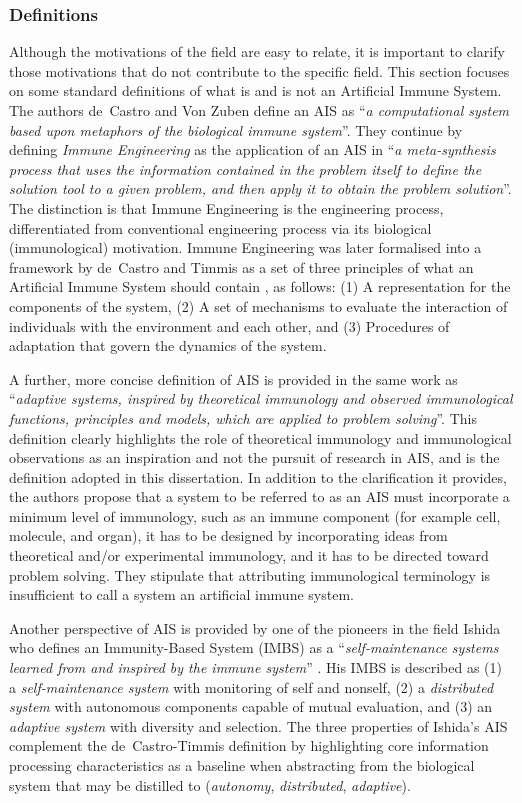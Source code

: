 %
%
\subsubsection{Definitions}
Although the motivations of the field are easy to relate, it is important to clarify those motivations that do not contribute to the specific field. This section focuses on some standard definitions of what is and is not an Artificial Immune System. The authors de~Castro and Von Zuben \cite{Castro2000a} define an AIS as ``\emph{a computational system based upon metaphors of the biological immune system}''. They continue by defining \emph{Immune Engineering} as the application of an AIS in ``\emph{a meta-synthesis process that uses the information contained in the problem itself to define the solution tool to a given problem, and then apply it to obtain the problem solution}''. The distinction is that Immune Engineering is the engineering process, differentiated from conventional engineering process via its biological (immunological) motivation. Immune Engineering was later formalised into a framework by de~Castro and Timmis as a set of three principles of what an Artificial Immune System should contain \cite{Castro2002a}, as follows: (1) A representation for the components of the system, (2) A set of mechanisms to evaluate the interaction of individuals with the environment and each other, and (3) Procedures of adaptation that govern the dynamics of the system.

A further, more concise definition of AIS is provided in the same work as ``\emph{adaptive systems, inspired by theoretical immunology and observed immunological functions, principles and models, which are applied to problem solving}''. This definition clearly highlights the role of theoretical immunology and immunological observations as an inspiration and not the pursuit of research in AIS, and is the definition adopted in this dissertation. In addition to the clarification it provides, the authors propose that a system to be referred to as an AIS must incorporate a minimum level of immunology, such as an immune component (for example cell, molecule, and organ), it has to be designed by incorporating ideas from theoretical and/or experimental immunology, and it has to be directed toward problem solving. They stipulate that attributing immunological terminology is insufficient to call a system an artificial immune system.

Another perspective of AIS is provided by one of the pioneers in the field Ishida who defines an Immunity-Based System (IMBS) as a ``\emph{self-maintenance systems learned from and inspired by the immune system}''  \cite{Ishida2004}. His IMBS is described as (1) a \emph{self-maintenance system} with monitoring of self and nonself, (2) a \emph{distributed system} with autonomous components capable of mutual evaluation, and (3) an \emph{adaptive system} with diversity and selection. The three properties of Ishida's AIS complement the de~Castro-Timmis definition by highlighting core information processing characteristics as a baseline when abstracting from the biological system that may be distilled to (\emph{autonomy}, \emph{distributed}, \emph{adaptive}). 


